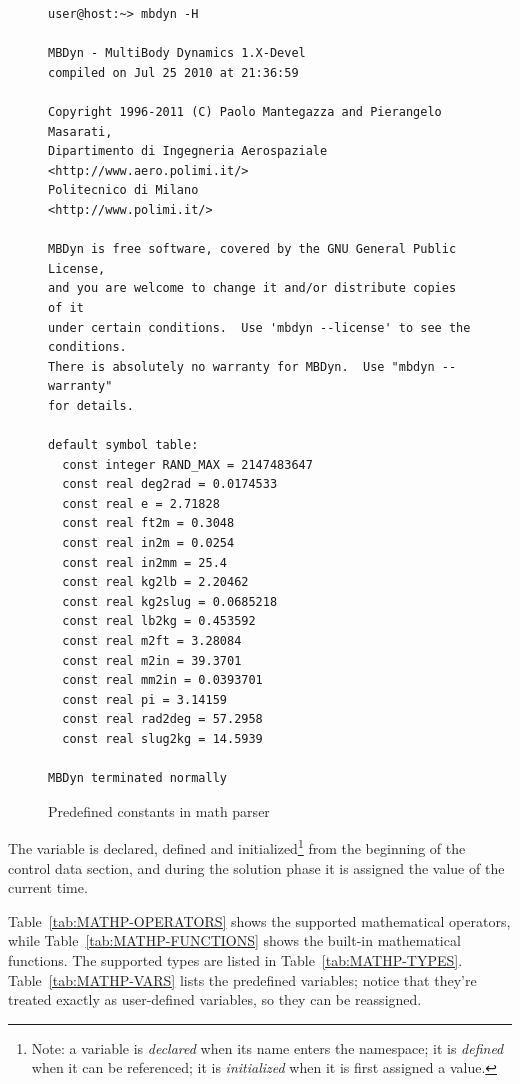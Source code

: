\begin{figure}
\label{fig:MBDYN-H}
\centering
\small
\begin{minipage}{120mm}
\begin{verbatim}
user@host:~> mbdyn -H

MBDyn - MultiBody Dynamics 1.X-Devel
compiled on Jul 25 2010 at 21:36:59

Copyright 1996-2011 (C) Paolo Mantegazza and Pierangelo Masarati,
Dipartimento di Ingegneria Aerospaziale <http://www.aero.polimi.it/>
Politecnico di Milano                   <http://www.polimi.it/>

MBDyn is free software, covered by the GNU General Public License,
and you are welcome to change it and/or distribute copies of it
under certain conditions.  Use 'mbdyn --license' to see the conditions.
There is absolutely no warranty for MBDyn.  Use "mbdyn --warranty"
for details.

default symbol table:
  const integer RAND_MAX = 2147483647
  const real deg2rad = 0.0174533
  const real e = 2.71828
  const real ft2m = 0.3048
  const real in2m = 0.0254
  const real in2mm = 25.4
  const real kg2lb = 2.20462
  const real kg2slug = 0.0685218
  const real lb2kg = 0.453592
  const real m2ft = 3.28084
  const real m2in = 39.3701
  const real mm2in = 0.0393701
  const real pi = 3.14159
  const real rad2deg = 57.2958
  const real slug2kg = 14.5939

MBDyn terminated normally
\end{verbatim}
\end{minipage}
\caption{Predefined constants in math parser}
\end{figure}

The variable  is declared, defined and initialized\footnote{
    Note: a variable is \emph{declared} when its name enters the namespace;
    it is \emph{defined} when it can be referenced;
    it is \emph{initialized} when it is first assigned a value.
} from the beginning of the control data section, and during the solution 
phase it is assigned the value of the current time. 

Table~\ref{tab:MATHP-OPERATORS} shows the supported mathematical 
operators, while Table~\ref{tab:MATHP-FUNCTIONS} shows the built-in
mathematical functions.
The supported types are listed in Table~\ref{tab:MATHP-TYPES}.
Table~\ref{tab:MATHP-VARS} lists the predefined variables; notice
that they're treated exactly as user-defined variables, so they 
can be reassigned.

